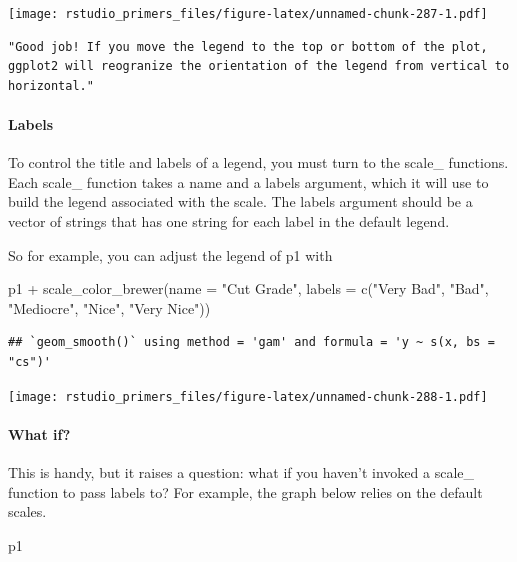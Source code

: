 \documentclass[
]{article}
\newenvironment{Shaded}{\begin{snugshade}}{\end{snugshade}}
\newcommand{\AttributeTok}[1]{\textcolor[rgb]{0.77,0.63,0.00}{#1}}
\newcommand{\FunctionTok}[1]{\textcolor[rgb]{0.00,0.00,0.00}{#1}}
\newcommand{\NormalTok}[1]{#1}
\newcommand{\SpecialCharTok}[1]{\textcolor[rgb]{0.00,0.00,0.00}{#1}}
\newcommand{\StringTok}[1]{\textcolor[rgb]{0.31,0.60,0.02}{#1}}
\begin{document}
\texttt{[image: rstudio\_primers\_files/figure-latex/unnamed-chunk-287-1.pdf]}

\begin{verbatim}
"Good job! If you move the legend to the top or bottom of the plot, ggplot2 will reogranize the orientation of the legend from vertical to horizontal."
\end{verbatim}

\hypertarget{labels-1}{%
\paragraph{Labels}\label{labels-1}}

To control the title and labels of a legend, you must turn to the
scale\_ functions. Each scale\_ function takes a name and a labels
argument, which it will use to build the legend associated with the
scale. The labels argument should be a vector of strings that has one
string for each label in the default legend.

So for example, you can adjust the legend of p1 with

\begin{Shaded}
\begin{Highlighting}[]
\NormalTok{p1 }\SpecialCharTok{+} \FunctionTok{scale\_color\_brewer}\NormalTok{(}\AttributeTok{name =} \StringTok{"Cut Grade"}\NormalTok{, }\AttributeTok{labels =} \FunctionTok{c}\NormalTok{(}\StringTok{"Very Bad"}\NormalTok{, }\StringTok{"Bad"}\NormalTok{, }\StringTok{"Mediocre"}\NormalTok{, }\StringTok{"Nice"}\NormalTok{, }\StringTok{"Very Nice"}\NormalTok{))}
\end{Highlighting}
\end{Shaded}

\begin{verbatim}
## `geom_smooth()` using method = 'gam' and formula = 'y ~ s(x, bs = "cs")'
\end{verbatim}

\texttt{[image: rstudio\_primers\_files/figure-latex/unnamed-chunk-288-1.pdf]}

\hypertarget{what-if-1}{%
\paragraph{What if?}\label{what-if-1}}

This is handy, but it raises a question: what if you haven't invoked a
scale\_ function to pass labels to? For example, the graph below relies
on the default scales.

\begin{Shaded}
\begin{Highlighting}[]
\NormalTok{p1}
\end{Highlighting}
\end{Shaded}
\end{document}

